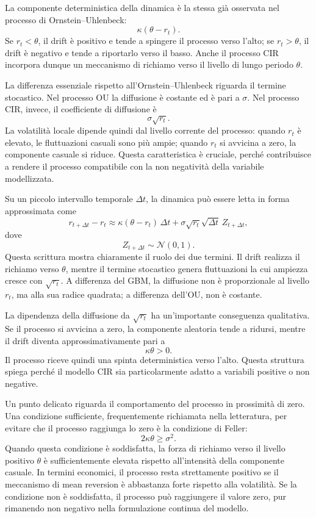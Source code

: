 La componente deterministica della dinamica \`{e} la stessa gi\`{a}
osservata nel processo di Ornstein--Uhlenbeck:
\[
\kappa(\theta-r_t).
\]
Se $r_t<\theta$, il drift \`{e} positivo e tende a spingere il processo
verso l'alto; se $r_t>\theta$, il drift \`{e} negativo e tende a
riportarlo verso il basso. Anche il processo CIR incorpora dunque un
meccanismo di richiamo verso il livello di lungo periodo $\theta$.

La differenza essenziale rispetto all'Ornstein--Uhlenbeck riguarda il
termine stocastico. Nel processo OU la diffusione \`{e} costante ed \`{e}
pari a $\sigma$. Nel processo CIR, invece, il coefficiente di diffusione
\`{e}
\[
\sigma\sqrt{r_t}.
\]
La volatilit\`{a} locale dipende quindi dal livello corrente del processo:
quando $r_t$ \`{e} elevato, le fluttuazioni casuali sono pi\`{u} ampie;
quando $r_t$ si avvicina a zero, la componente casuale si riduce. Questa
caratteristica \`{e} cruciale, perch\'{e} contribuisce a rendere il
processo compatibile con la non negativit\`{a} della variabile
modellizzata.

Su un piccolo intervallo temporale $\Delta t$, la dinamica pu\`{o}
essere letta in forma approssimata come
\[
r_{t+\Delta t}-r_t
\approx
\kappa(\theta-r_t)\,\Delta t
+
\sigma\sqrt{r_t}\sqrt{\Delta t}\,Z_{t+\Delta t},
\]
dove
\[
Z_{t+\Delta t}\sim\mathcal{N}(0,1).
\]
Questa scrittura mostra chiaramente il ruolo dei due termini. Il drift
realizza il richiamo verso $\theta$, mentre il termine stocastico genera
fluttuazioni la cui ampiezza cresce con $\sqrt{r_t}$. A differenza del
GBM, la diffusione non \`{e} proporzionale al livello $r_t$, ma alla sua
radice quadrata; a differenza dell'OU, non \`{e} costante.

La dipendenza della diffusione da $\sqrt{r_t}$ ha un'importante
conseguenza qualitativa. Se il processo si avvicina a zero, la componente
aleatoria tende a ridursi, mentre il drift diventa approssimativamente
pari a
\[
\kappa\theta>0.
\]
Il processo riceve quindi una spinta deterministica verso l'alto. Questa
struttura spiega perch\'{e} il modello CIR sia particolarmente adatto a
variabili positive o non negative.

Un punto delicato riguarda il comportamento del processo in prossimit\`{a}
di zero. Una condizione sufficiente, frequentemente richiamata nella
letteratura, per evitare che il processo raggiunga lo zero \`{e} la
condizione di Feller:
\[
2\kappa\theta\geq\sigma^2.
\]
Quando questa condizione \`{e} soddisfatta, la forza di richiamo verso il
livello positivo $\theta$ \`{e} sufficientemente elevata rispetto
all'intensit\`{a} della componente casuale. In termini economici, il
processo resta strettamente positivo se il meccanismo di mean reversion
\`{e} abbastanza forte rispetto alla volatilit\`{a}. Se la condizione non
\`{e} soddisfatta, il processo pu\`{o} raggiungere il valore zero, pur
rimanendo non negativo nella formulazione continua del modello.

